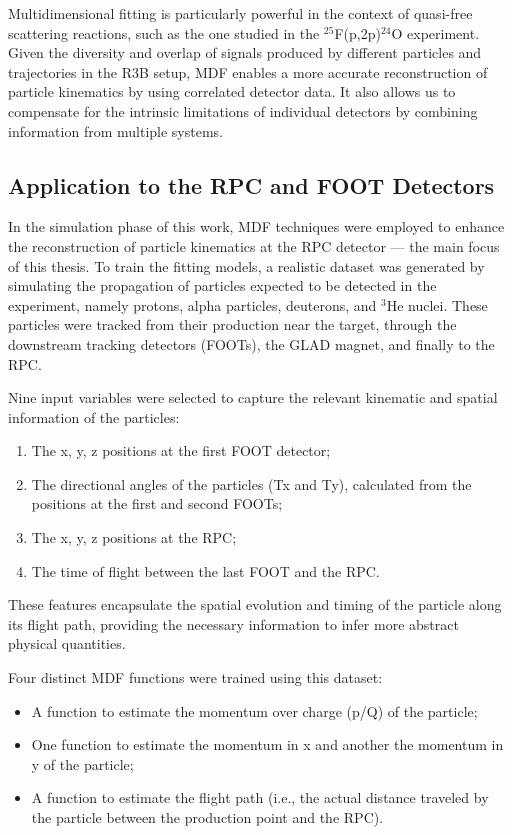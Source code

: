 Multidimensional fitting is particularly powerful in the context of quasi-free scattering reactions, such as the one studied in the $^{25}$F(p,2p)$^{24}$O experiment. Given the diversity and overlap of signals produced by different particles and trajectories in the \gls{R3B} setup, MDF enables a more accurate reconstruction of particle kinematics by using correlated detector data. It also allows us to compensate for the intrinsic limitations of individual detectors by combining information from multiple systems.

\subsection{Application to the RPC and FOOT Detectors}

In the simulation phase of this work, MDF techniques were employed to enhance the reconstruction of particle kinematics at the \gls{RPC} detector — the main focus of this thesis. To train the fitting models, a realistic dataset was generated by simulating the propagation of particles expected to be detected in the experiment, namely protons, alpha particles, deuterons, and $^3$He nuclei. These particles were tracked from their production near the target, through the downstream tracking detectors (FOOTs), the GLAD magnet, and finally to the \gls{RPC}.

Nine input variables were selected to capture the relevant kinematic and spatial information of the particles:
\begin{enumerate}
	\item The x, y, z positions at the first FOOT detector;
	\item The directional angles of the particles (Tx and Ty), calculated from the positions at the first and second FOOTs;
	\item The x, y, z positions at the \gls{RPC};
	\item The time of flight between the last FOOT and the \gls{RPC}.
\end{enumerate}


These features encapsulate the spatial evolution and timing of the particle along its flight path, providing the necessary information to infer more abstract physical quantities.

Four distinct MDF functions were trained using this dataset:

\begin{itemize}
	\item A function to estimate the momentum over charge (p/Q) of the particle;
	\item One function to estimate the momentum in x and another the momentum in y of the particle;
	\item A function to estimate the flight path (i.e., the actual distance traveled by the particle between the production point and the \gls{RPC}).
\end{itemize}


